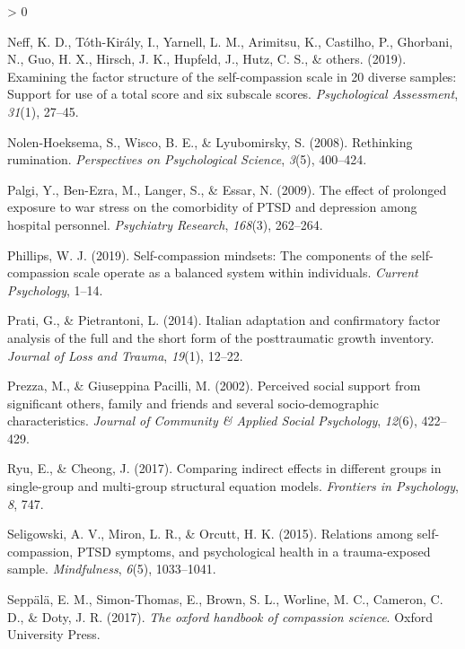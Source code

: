 \documentclass[
  english,
  man,floatsintext]{apa7}
\newlength{\cslhangindent}
\newenvironment{CSLReferences}[2] %
 {%
  \setlength{\parindent}{0pt}
  \ifodd #1 \everypar{\setlength{\hangindent}{\cslhangindent}}\ignorespaces\fi
  \ifnum #2 > 0
  \setlength{\parskip}{#2\baselineskip}
  \fi
 }%
 {}
\begin{document}
\begin{CSLReferences}{1}{0}
\leavevmode\hypertarget{ref-neff2019examining}{}%
Neff, K. D., Tóth-Király, I., Yarnell, L. M., Arimitsu, K., Castilho, P., Ghorbani, N., Guo, H. X., Hirsch, J. K., Hupfeld, J., Hutz, C. S., \& others. (2019). Examining the factor structure of the self-compassion scale in 20 diverse samples: Support for use of a total score and six subscale scores. \emph{Psychological Assessment}, \emph{31}(1), 27--45.

\leavevmode\hypertarget{ref-nolen2008rethinking}{}%
Nolen-Hoeksema, S., Wisco, B. E., \& Lyubomirsky, S. (2008). Rethinking rumination. \emph{Perspectives on Psychological Science}, \emph{3}(5), 400--424.

\leavevmode\hypertarget{ref-palgi2009effect}{}%
Palgi, Y., Ben-Ezra, M., Langer, S., \& Essar, N. (2009). The effect of prolonged exposure to war stress on the comorbidity of PTSD and depression among hospital personnel. \emph{Psychiatry Research}, \emph{168}(3), 262--264.

\leavevmode\hypertarget{ref-phillips2019self}{}%
Phillips, W. J. (2019). Self-compassion mindsets: The components of the self-compassion scale operate as a balanced system within individuals. \emph{Current Psychology}, 1--14.

\leavevmode\hypertarget{ref-prati2014italian}{}%
Prati, G., \& Pietrantoni, L. (2014). Italian adaptation and confirmatory factor analysis of the full and the short form of the posttraumatic growth inventory. \emph{Journal of Loss and Trauma}, \emph{19}(1), 12--22.

\leavevmode\hypertarget{ref-prezza2002perceived}{}%
Prezza, M., \& Giuseppina Pacilli, M. (2002). Perceived social support from significant others, family and friends and several socio-demographic characteristics. \emph{Journal of Community \& Applied Social Psychology}, \emph{12}(6), 422--429.

\leavevmode\hypertarget{ref-ryu2017comparing}{}%
Ryu, E., \& Cheong, J. (2017). Comparing indirect effects in different groups in single-group and multi-group structural equation models. \emph{Frontiers in Psychology}, \emph{8}, 747.

\leavevmode\hypertarget{ref-seligowski2015relations}{}%
Seligowski, A. V., Miron, L. R., \& Orcutt, H. K. (2015). Relations among self-compassion, PTSD symptoms, and psychological health in a trauma-exposed sample. \emph{Mindfulness}, \emph{6}(5), 1033--1041.

\leavevmode\hypertarget{ref-seppala2017oxford}{}%
Seppälä, E. M., Simon-Thomas, E., Brown, S. L., Worline, M. C., Cameron, C. D., \& Doty, J. R. (2017). \emph{The oxford handbook of compassion science}. Oxford University Press.


\end{CSLReferences}
\end{document}
